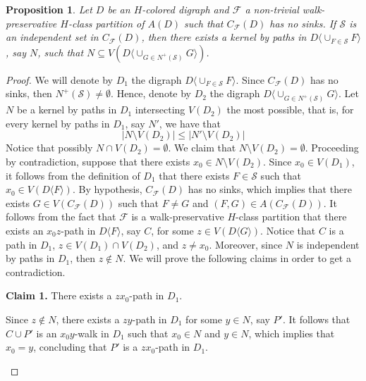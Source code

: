 \documentclass[10pt,a4paper]{article}
\newtheorem{prop}[theorem]{Proposition}
\begin{document}
\begin{prop}
\label{c1.p1bis}
Let $D$ be an $H$-colored digraph and $\mathscr{F}$ a non-trivial walk-preservative $H$-class partition of $A(D)$ such that $C_{\mathscr{F}}(D)$ has no sinks. If $\mathcal{S}$ is an independent set in $C_{\mathscr{F}}(D)$, then there exists a kernel by paths in $D\langle \cup_{F \in \mathcal{S}} F\rangle$, say $N$, such that $N \subseteq V(D\langle \cup_{G \in  N^{+}(\mathcal{S})} G \rangle )$.
\end{prop}
\begin{proof}
We will denote by $D_{1}$ the digraph $D\langle \cup_{F \in \mathcal{S}} F\rangle$. Since $C_{\mathscr{F}}(D)$ has no sinks, then $N^{+}(\mathcal{S})\neq \emptyset$. Hence, denote by $D_{2}$ the digraph $D\langle \cup_{G \in  N^{+}(\mathcal{S})} G \rangle$. Let $N$ be a kernel by paths in $D_{1}$ intersecting $V(D_{2})$ the most possible, that is, for every kernel by paths in $D_{1}$, say $N'$, we have that
	\begin{equation}
	\label{rb.l3.ec1}
	|N \setminus V(D_{2})| \leq |N' \setminus V(D_{2})|
	\end{equation}
Notice that possibly $N \cap V(D_{2})=\emptyset$. We claim that $N \setminus V(D_{2})=\emptyset$. Proceeding by contradiction, suppose that there exists $x_{0} \in N \setminus V(D_{2})$.  Since $x_{0} \in V(D_{1})$, it follows from the definition of $D_{1}$ that there exists $F \in \mathcal{S}$ such that $x_{0} \in V(D \langle F \rangle)$. By hypothesis, $C_{\mathscr{F}}(D)$ has no sinks, which implies that there exists $G \in V(C_{\mathscr{F}}(D))$ such that $F \neq G$ and $(F, G) \in A(C_{\mathscr{F}}(D))$. It follows from the fact that $\mathscr{F}$ is a walk-preservative $H$-class partition that there exists an $x_{0}z$-path in $D\langle F \rangle$, say $C$, for some $z \in V(D \langle G \rangle)$. Notice that $C$ is a path in $D_{1}$, $z \in V(D_{1}) \cap V(D_{2})$, and $z \neq x_{0}$. Moreover, since $N$ is independent by paths in $D_{1}$, then $z \notin N$. We will prove the following claims in order to get a contradiction.
\begin{description}
	\item \textbf{Claim 1.} There exists a $zx_{0}$-path in $D_{1}$.

Since $z \notin N$, there exists a $zy$-path in $D_{1}$ for some $y \in N$, say $P'$. It follows that $C \cup P'$ is an $x_{0}y$-walk in $D_{1}$ such that $x_{0} \in N$ and $y\in N$, which implies that $x_{0}=y$, concluding that $P'$ is a $zx_{0}$-path in $D_{1}$.


\end{description}
\end{proof}
\end{document}
